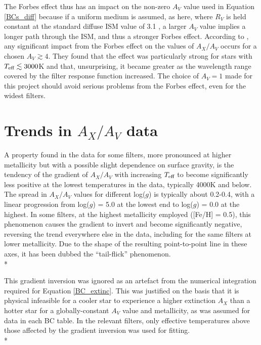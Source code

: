 \documentclass[12pt, a4paper]{report}
\begin{document}
The Forbes effect thus has an impact on the non-zero $A_{V}$ value used in Equation \ref{BCs_diff} because if a uniform medium is assumed, as here, where $R_{V}$ is held constant at the standard diffuse ISM value of 3.1 \citep{1989ApJ...345..245C}, a larger $A_{V}$ value implies a longer path through the ISM, and thus a stronger Forbes effect. According to \cite{2008PASP..120..583G}, any significant impact from the Forbes effect on the values of $A_{X}/A_{V}$ occurs for a chosen $A_{V} \gtrsim 4$. They found that the effect was particularly strong for stars with $T_{\textnormal{eff}} \lesssim 3000$K and that, unsurprising, it became greater as the wavelength range covered by the filter response function increased. The choice of $A_{V} = 1$ made for this project should avoid serious problems from the Forbes effect, even for the widest filters.

\section{Trends in $A_{X}/A_{V}$ data}
A property found in the data for some filters, more pronounced at higher metallicity but with a possible slight dependence on surface gravity, is the tendency of the gradient of $A_{X}/A_{V}$ with increasing $T_{\textnormal{eff}}$ to become significantly less positive at the lowest temperatures in the data, typically 4000K and below. The spread in $A_{X}/A_{V}$ values for different log($g$) is typically about 0.2-0.4, with a linear progression from log($g$) = 5.0 at the lowest end to log($g$) = 0.0 at the highest. In some filters, at the highest metallicity employed ([Fe/H] = 0.5), this phenomenon causes the gradient to invert and become significantly negative, reversing the trend everywhere else in the data, including for the same filters at lower metallicity. Due to the shape of the resulting point-to-point line in these axes, it has been dubbed the ``tail-flick'' phenomenon.\\*

This gradient inversion was ignored as an artefact from the numerical integration required for Equation \ref{BC_extinc}. This was justified on the basis that it is physical infeasible for a cooler star to experience a higher extinction $A_{X}$ than a hotter star for a globally-constant $A_{V}$ value and metallicity, as was assumed for data in each BC table. In the relevant filters, only effective temperatures above those affected by the gradient inversion was used for fitting.\\*
\end{document}
